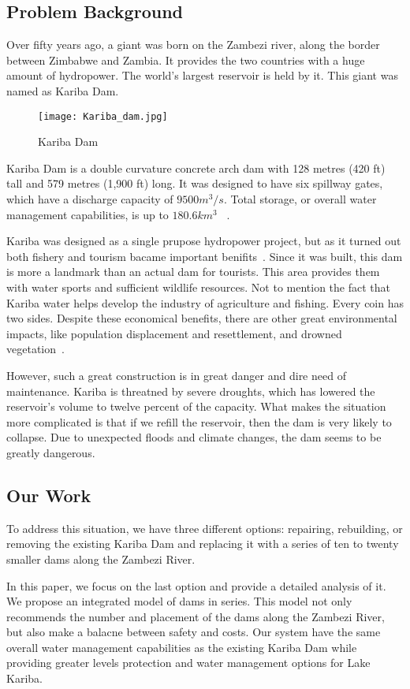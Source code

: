 \documentclass{mcmthesis}
\begin{document}
\subsection{Problem Background}
	Over fifty years ago, a giant was born on the Zambezi river, along the border between Zimbabwe and Zambia. It provides the two countries with a huge amount of hydropower. The world's largest reservoir is held by it. This giant was named as Kariba Dam.
\begin{figure}[h]
    \centering
    \texttt{[image: Kariba\_dam.jpg]}
    \caption{Kariba Dam~\cite{Wiki_Kariba}}
    \label{fig:dam}
\end{figure}

Kariba Dam is a double curvature concrete arch dam with 128 metres (420 ft) tall and 579 metres (1,900 ft) long. It was designed to have six spillway gates, which have a discharge capacity of $9500m^3/s$. Total storage, or overall water management capabilities, is up to $180.6km^3$ ~\cite{WCD_Dam}.

Kariba was designed as a single prupose hydropower project, but as it turned out both fishery and tourism bacame important benifits~\cite{WCD_Dam}. Since it was built, this dam is more a landmark than an actual dam for tourists. This area provides them with water sports and sufficient wildlife resources. Not to mention the fact that Kariba water helps develop the industry of agriculture and fishing. Every coin has two sides. Despite these economical benefits, there are other great environmental impacts, like population displacement and resettlement, and drowned vegetation~\cite{Wiki_Kariba}.

However, such a great construction is in great danger and dire need of maintenance. Kariba is threatned by severe droughts, which has lowered the reservoir's volume to twelve percent of the capacity. What makes the situation more complicated is that if we refill the reservoir, then the dam is very likely to collapse. Due to unexpected floods and climate changes, the dam seems to be greatly dangerous.
\subsection{Our Work}
To address this situation, we have three different options: repairing, rebuilding, or removing the existing Kariba Dam and replacing it with a series of ten to twenty smaller dams along the Zambezi River.

In this paper, we focus on the last option and provide a detailed analysis of it. We propose an integrated model of dams in series. This model not only recommends the number and placement of the dams along the Zambezi River, but also make a balacne between safety and costs. Our system have the same overall water management capabilities as the existing Kariba Dam while providing greater levels protection and water management options for Lake Kariba.
\end{document}

